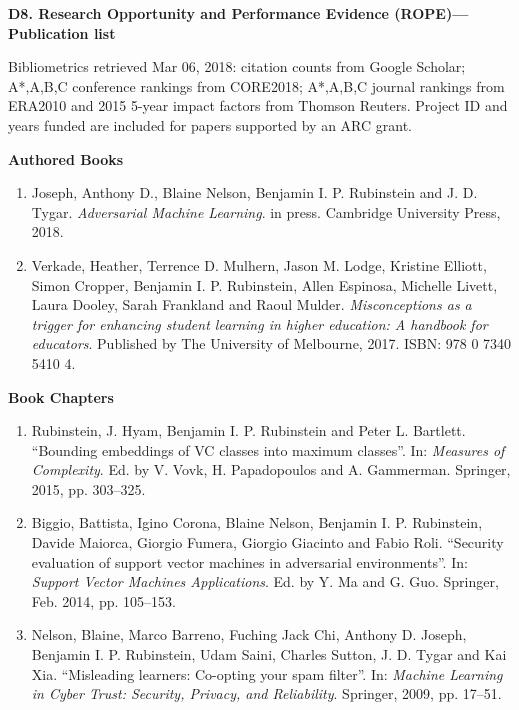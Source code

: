 \documentclass[a4paper,12pt]{article}
\title{}
\author{}
\date{}
\begin{document}
 \setcounter{list}{0}

\noindent \textbf{D8. Research Opportunity and Performance Evidence (ROPE)---Publication list}

\noindent Bibliometrics retrieved Mar 06, 2018: citation counts from
Google Scholar; A*,A,B,C conference rankings from CORE2018; A*,A,B,C
journal rankings from ERA2010 and 2015 5-year impact factors from
Thomson Reuters. Project ID and years funded are included for papers
supported by an ARC grant.

\noindent\textbf{Authored Books}

\begin{enumerate}
\setcounter{enumi}{\value{list}}

\item Joseph, Anthony D., Blaine Nelson, Benjamin I. P. Rubinstein and J. D. Tygar.
\emph{Adversarial Machine Learning}.
in press.
Cambridge University Press, 2018.

\item Verkade, Heather, Terrence D. Mulhern, Jason M. Lodge, Kristine Elliott, Simon Cropper, Benjamin I. P. Rubinstein, Allen Espinosa, Michelle Livett, Laura Dooley, Sarah Frankland and Raoul Mulder.
\emph{Misconceptions as a trigger for enhancing student learning in higher education: A handbook for educators}.
Published by The University of Melbourne, 2017.
ISBN: 978 0 7340 5410 4.


\setcounter{list}{\value{enumi}}
\end{enumerate}

\noindent\textbf{Book Chapters}

\begin{enumerate}
\setcounter{enumi}{\value{list}}

\item Rubinstein, J. Hyam, Benjamin I. P. Rubinstein and Peter L. Bartlett.
``Bounding embeddings of VC classes into maximum classes''.
In: 
\emph{Measures of Complexity}.
Ed. by V. Vovk, H. Papadopoulos and A. Gammerman.
Springer, 2015, pp. 303--325.

\item Biggio, Battista, Igino Corona, Blaine Nelson, Benjamin I. P. Rubinstein, Davide Maiorca, Giorgio Fumera, Giorgio Giacinto and Fabio Roli.
``Security evaluation of support vector machines in adversarial environments''.
In: 
\emph{Support Vector Machines Applications}.
Ed. by Y. Ma and G. Guo.
Springer, Feb. 2014, pp. 105--153.

\item Nelson, Blaine, Marco Barreno, Fuching Jack Chi, Anthony D. Joseph, Benjamin I. P. Rubinstein, Udam Saini, Charles Sutton, J. D. Tygar and Kai Xia.
``Misleading learners: Co-opting your spam filter''.
In: 
\emph{Machine Learning in Cyber Trust: Security, Privacy, and Reliability}.
Springer, 2009, pp. 17--51.


\setcounter{list}{\value{enumi}}
\end{enumerate}
\end{document}

